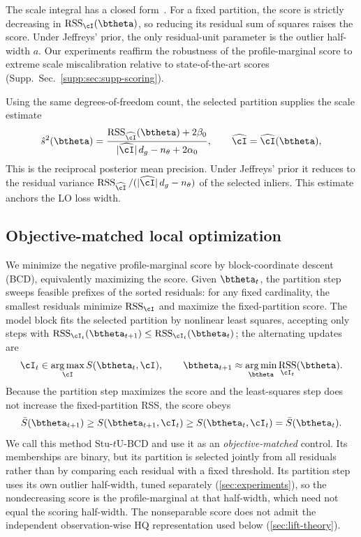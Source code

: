\documentclass[runningheads]{llncs}
\newcommand{\suppsec}[1]{Supp.\ Sec.~\ref{supp:#1}}
\DeclareMathOperator{\RSS}{RSS}
\DeclareMathOperator*{\argmax}{arg\,max}
\DeclareMathOperator*{\argmin}{arg\,min}
\newcommand{\stuU}{Stu-$t$U}          %
\begin{document}
The scale integral has a closed form~\cite{PrittsScoring2026}. For a fixed
partition, the score is strictly decreasing in $\RSS_{\cI}(\btheta)$, so
reducing its residual sum of squares raises the score. Under Jeffreys' prior,
the only residual-unit parameter is the outlier half-width $a$.
Our experiments reaffirm the robustness of the profile-marginal score
to extreme scale miscalibration relative to state-of-the-art scores
(\suppsec{sec:supp-scoring}).

Using the same degrees-of-freedom count, the selected partition
supplies the scale estimate
\begin{equation}
	\hat s^2(\btheta)
	=\frac{\RSS_{\widehat{\cI}}(\btheta)+2\beta_0}
	{|\widehat{\cI}|\,d_g-n_\theta+2\alpha_0},
	\qquad \widehat{\cI}=\widehat{\cI}(\btheta),
	\label{eq:partition-scale}
\end{equation}
This is the reciprocal posterior mean precision. Under Jeffreys' prior it
reduces to the residual variance
$\RSS_{\widehat{\cI}}/(|\widehat{\cI}|\,d_g-n_\theta)$
of the selected inliers. This estimate anchors the LO loss width.

\subsection{Objective-matched local optimization}
\label{sec:matching-lo}
We minimize the negative profile-marginal score by block-coordinate
descent (BCD), equivalently maximizing the score. Given $\btheta_t$, the
partition step sweeps feasible prefixes of the sorted residuals: for any
fixed cardinality, the smallest residuals minimize $\RSS_{\cI}$ and
maximize the fixed-partition score. The model block fits the selected
partition by nonlinear least squares, accepting only steps with
$\RSS_{\cI_t}(\btheta_{t+1})\le\RSS_{\cI_t}(\btheta_t)$; the alternating updates are
\begin{equation}
	\cI_t\in\argmax_{\cI} S(\btheta_t,\cI),\qquad
	\btheta_{t+1}\approx\argmin_{\btheta}\RSS_{\cI_t}(\btheta).
	\label{eq:bcd-updates}
\end{equation}
Because the partition step maximizes the score and the least-squares step
does not increase the fixed-partition RSS, the score obeys
\begin{equation}
	\bar S(\btheta_{t+1})
	\ge S(\btheta_{t+1},\cI_t)
	\ge S(\btheta_t,\cI_t)
	=\bar S(\btheta_t).
	\label{eq:bcd-monotonicity}
\end{equation}
We call this method \stuU{}-BCD and
use it as an \emph{objective-matched} control. Its memberships are binary,
but its partition is selected jointly from all residuals rather than by
comparing each residual with a fixed threshold. Its partition step uses
its own outlier half-width, tuned separately (\cref{sec:experiments}), so the
nondecreasing score is the profile-marginal at that half-width, which
need not equal the scoring half-width. The nonseparable score
does not admit the independent observation-wise HQ representation used
below (\cref{sec:lift-theory}).
\end{document}
